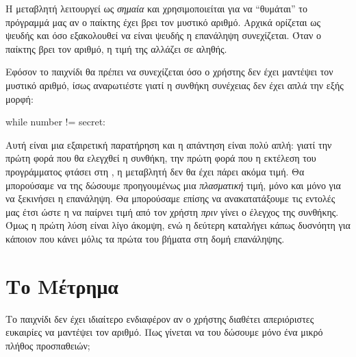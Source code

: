 \documentclass[a4paper,11pt,oneside]{book}
\begin{document}
H μεταβλητή  λειτουργεί ως \emph{σημαία} και χρησιμοποιείται για να ``θυμάται'' το πρόγραμμά μας αν ο παίκτης έχει βρει τον μυστικό αριθμό. Αρχικά ορίζεται ως ψευδής και όσο εξακολουθεί να είναι ψευδής η επανάληψη συνεχίζεται. Όταν ο παίκτης βρει τον αριθμό, η τιμή της  αλλάζει σε αληθής.



Εφόσον το παιχνίδι θα πρέπει να συνεχίζεται όσο ο χρήστης δεν έχει μαντέψει τον μυστικό αριθμό, ίσως αναρωτιέστε γιατί η συνθήκη συνέχειας δεν έχει απλά την εξής μορφή:

\begin{pycode}
while number != secret:
\end{pycode}

Αυτή είναι μια εξαιρετική παρατήρηση και η απάντηση είναι πολύ απλή: γιατί την πρώτη φορά που θα ελεγχθεί η συνθήκη, την πρώτη φορά που η εκτέλεση του προγράμματος φτάσει στη , η μεταβλητή  δεν θα έχει πάρει ακόμα τιμή. Θα μπορούσαμε να της δώσουμε προηγουμένως μια \emph{πλασματική} τιμή, μόνο και μόνο για να ξεκινήσει η επανάληψη. Θα μπορούσαμε επίσης να ανακατατάξουμε τις εντολές μας έτσι ώστε η  να παίρνει τιμή από τον χρήστη \emph{πριν} γίνει ο έλεγχος της συνθήκης. Όμως η πρώτη λύση είναι λίγο άκομψη, ενώ η δεύτερη καταλήγει κάπως δυσνόητη για κάποιον που κάνει μόλις τα πρώτα του βήματα στη δομή επανάληψης.


\section{Το Μέτρημα}

\begin{question}
Το παιχνίδι δεν έχει ιδιαίτερο ενδιαφέρον αν ο χρήστης διαθέτει απεριόριστες ευκαιρίες
να μαντέψει τον αριθμό. Πως γίνεται να του δώσουμε μόνο ένα μικρό πλήθος προσπαθειών;
\end{question}
\end{document}
